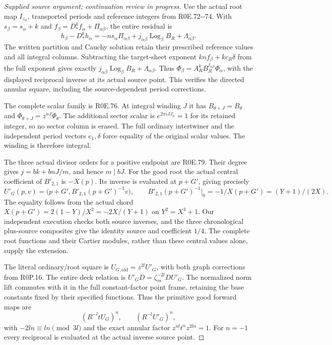 \begin{proof}[Supplied source argument; continuation review in progress]
\par\nobreak

Use the actual root map \(I_{z_\alpha}\), transported
periods and reference integers from R0E.72-\/-74. With
\(s_\beta=s_\alpha+k\) and
\(f_\beta=D_*^kf_\alpha+\Pi_{\alpha\beta}\), the
entire residual is
\[
 h_\beta-D_*^kh_\alpha
 =-n s_\alpha\Pi_{\alpha\beta}
   +j_{\alpha\beta}\operatorname{Log}_\beta B_R
   +\Lambda_{\alpha\beta}.
 \tag{R0P.18}
\]
The written partition and Cauchy solution retain their
prescribed reference values and all integral columns.
Subtracting the target-sheet exponent
\(knf_\beta+kc_R\delta\) from the full exponent gives
exactly \(j_{\alpha\beta}\operatorname{Log}_\beta B_R+
\Lambda_{\alpha\beta}\). Thus
\(\Phi_\beta=A_R^kB_R^{j_{\alpha\beta}}\Phi_\alpha\),
with the displayed reciprocal inverse at its actual source
point. This verifies the directed annular square, including
the source-dependent period corrections.

The complete scalar family is R0E.76. At integral winding
\(J\) it has \(B_{\theta+J}=B_\theta\) and
\(\Phi_{\theta+J}=z^{nJ}\Phi_\theta\). The additional
sector scalar is \(e^{2\pi iJ J_\alpha}=1\) for its
retained integer, so no sector column is erased. The full
ordinary intertwiner and the independent period vectors
\(e_1,\delta\) force equality of the original scalar
values. The winding is therefore integral.

The three actual divisor orders for a positive endpoint are
R0E.79. Their degree gives \(j=bk+bnJ/m\), and hence
\(m\mid bJ\). For the good root the actual central
coefficient of \(B'_{2,1}\) is \(-X(p)\). Its inverse
is evaluated at \(p+G'\), giving precisely
\[
 U'_G(p,v)=\bigl(p+G',B'_{2,1}(p+G')^{-1}v\bigr),
 \qquad B'_{2,1}(p+G')^{-1}\big|_0
 =-1/X(p+G')=(Y+1)/(2X).
 \tag{R0P.19}
\]
The equality follows from the actual chord
\(X(p+G')=2(1-Y)/X^2=-2X/(Y+1)\) on
\(Y^2=X^3+1\). Our independent execution checks both
source inverses, and the three chronological plus-source
composites give the identity source and coefficient \(1/4\).
The complete root functions and their Cartier modules,
rather than these central values alone, supply the extension.

The literal ordinary/root square is
\(U_{G,\mathrm{old}}=z^{2l}U'_G\), with both graph
corrections from R0P.16. The entire deck relation is
\(U'_G D=\zeta_m^{-2l}D U'_G\). The normalized norm
lift commutes with it in the full constant-factor point
frame, retaining the base constants fixed by their
specified functions. Thus the primitive good forward maps
are
\[
 (R^{-l}tU_G)^n,\qquad (R^{-l}U'_G)^n,
 \tag{R0P.20}
\]
with \(-2ln\equiv ln\pmod {3l}\) and the exact
annular factor \(z^{nl}t^nz^{2ln}=1\).
For \(n=-1\) every reciprocal is evaluated at the
actual inverse source point.


\end{proof}
